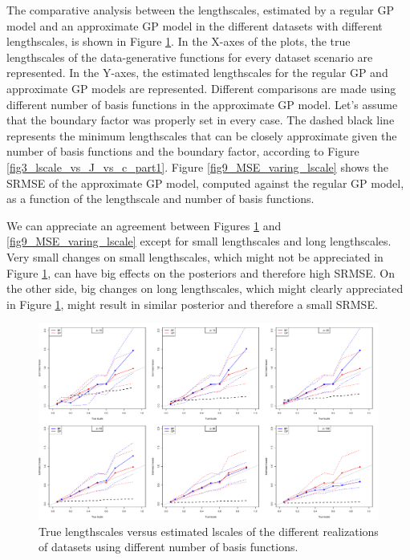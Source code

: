 \documentclass[]{interact}
\theoremstyle{plain}%
\theoremstyle{definition}
\theoremstyle{remark}
\begin{document}
The comparative analysis between the lengthscales, estimated by a regular GP model and an approximate GP model in the different datasets with different lengthscales, is shown in Figure \ref{fig8_Tlscale_vs_Elscale}. In the X-axes of the plots, the true lengthscales of the data-generative functions for every dataset scenario are represented. In the Y-axes, the estimated lengthscales for the regular GP and approximate GP models are represented. Different comparisons are made using different number of basis functions in the approximate GP model. Let's assume that the boundary factor was properly set in every case. The dashed black line represents the minimum lengthscales that can be closely approximate given the number of basis functions and the boundary factor, according to Figure \ref{fig3_lscale_vs_J_vs_c_part1}. Figure \ref{fig9_MSE_varing_lscale} shows the SRMSE of the approximate GP model, computed against the regular GP model, as a function of the lengthscale and number of basis functions.

We can appreciate an agreement between Figures \ref{fig8_Tlscale_vs_Elscale} and \ref{fig9_MSE_varing_lscale} except for small lengthscales and long lengthscales. Very small changes on small lengthscales, which might not be appreciated in Figure \ref{fig8_Tlscale_vs_Elscale}, can have big effects on the posteriors and therefore high SRMSE. On the other side, big changes on long lengthscales, which might clearly appreciated in Figure \ref{fig8_Tlscale_vs_Elscale}, might result in similar posterior and therefore a small SRMSE.

\begin{figure}
\centering
\includegraphics[width=\textwidth]{fig8_Tlscale_vs_Elscale.pdf}
\caption{True lengthscales versus estimated lscales of the different realizations of datasets using different number of basis functions. }
  \label{fig8_Tlscale_vs_Elscale}
\end{figure}
\end{document}
